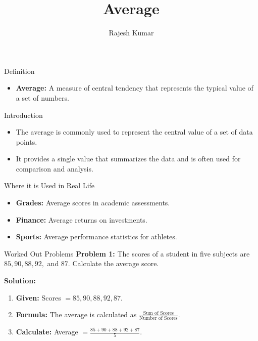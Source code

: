 
\title{Average}
\author{Rajesh Kumar}
\date{}

\begin{frame}
  \titlepage
\end{frame}

\begin{frame}{Definition}
  \begin{itemize}
    \item \textbf{Average:} A measure of central tendency that represents the typical value of a set of numbers.
  \end{itemize}
\end{frame}

\begin{frame}{Introduction}
  \begin{itemize}
    \item The average is commonly used to represent the central value of a set of data points.
    \item It provides a single value that summarizes the data and is often used for comparison and analysis.
  \end{itemize}
\end{frame}

\begin{frame}{Where it is Used in Real Life}
  \begin{itemize}
    \item \textbf{Grades:} Average scores in academic assessments.
    \item \textbf{Finance:} Average returns on investments.
    \item \textbf{Sports:} Average performance statistics for athletes.
  \end{itemize}
\end{frame}

\begin{frame}{Worked Out Problems}
  \textbf{Problem 1:} The scores of a student in five subjects are $85, 90, 88, 92,$ and $87.$ Calculate the average score.

  \textbf{Solution:}
  \begin{enumerate}
    \item \textbf{Given:} Scores $= 85, 90, 88, 92, 87$.
    \item \textbf{Formula:} The average is calculated as $\frac{\text{Sum of Scores}}{\text{Number of Scores}}$.
    \item \textbf{Calculate:} Average $= \frac{85 + 90 + 88 + 92 + 87}{5}$.
  \end{enumerate}
\end{frame}

